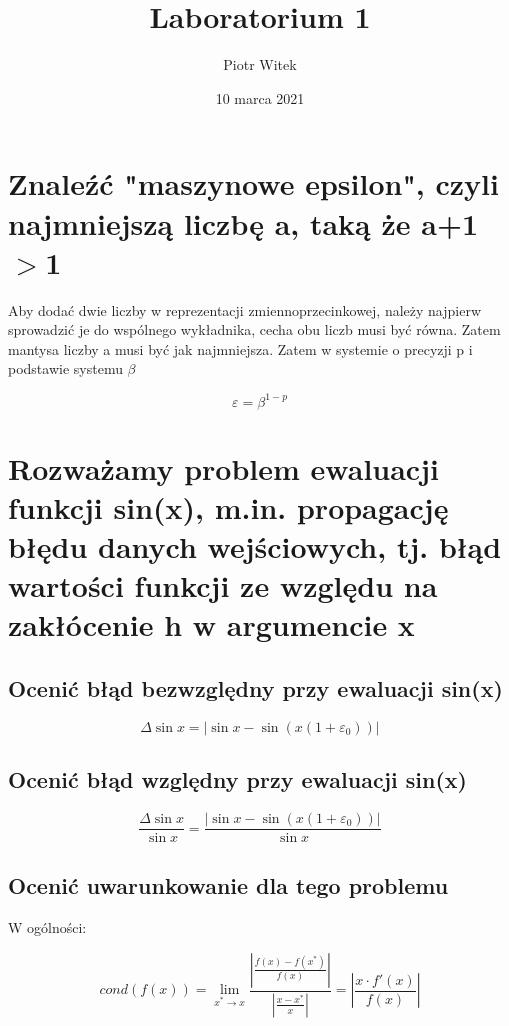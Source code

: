 \documentclass[5]{article}
\title{Laboratorium 1}
\author{Piotr Witek}
\date{10 marca 2021}
\begin{document}

\maketitle

\section{Znaleźć "maszynowe epsilon", czyli najmniejszą liczbę a, taką że a+1$>$1}

Aby dodać dwie liczby w reprezentacji zmiennoprzecinkowej, należy najpierw sprowadzić je do wspólnego wykładnika, cecha obu liczb musi być równa. Zatem mantysa liczby a musi być jak najmniejsza.
Zatem w systemie o precyzji p i podstawie systemu $\beta$

\[\varepsilon = \beta ^{1-p}\]


\section{Rozważamy problem ewaluacji funkcji sin(x), m.in. propagację błędu danych wejściowych, tj. błąd wartości funkcji ze względu na zakłócenie h w argumencie x}


\subsection{Ocenić błąd bezwzględny przy ewaluacji sin(x)}

\[\Delta \sin x = \left | \sin x - \sin \left ( x\left ( 1 + \varepsilon _{0} \right ) \right ) \right |\]

\subsection{Ocenić błąd względny przy ewaluacji sin(x)}

\[\frac{\Delta \sin x}{\sin x} = \frac{\left | \sin x - \sin \left ( x\left ( 1 + \varepsilon _{0} \right ) \right ) \right |}{\sin x}\]

\subsection{Ocenić uwarunkowanie dla tego problemu}

\hspace{4mm}W ogólności:

\[cond\left ( f\left ( x \right ) \right ) = \lim _{x^{*}\rightarrow x}\frac{\left | \frac{f\left ( x \right )-f\left ( x^{*} \right )}{f\left ( x \right )} \right |}{\left | \frac{x-x^{*}}{x} \right |} = \left | \frac{x\cdot f'\left ( x \right )}{f\left ( x \right )} \right| \]
\end{document}
